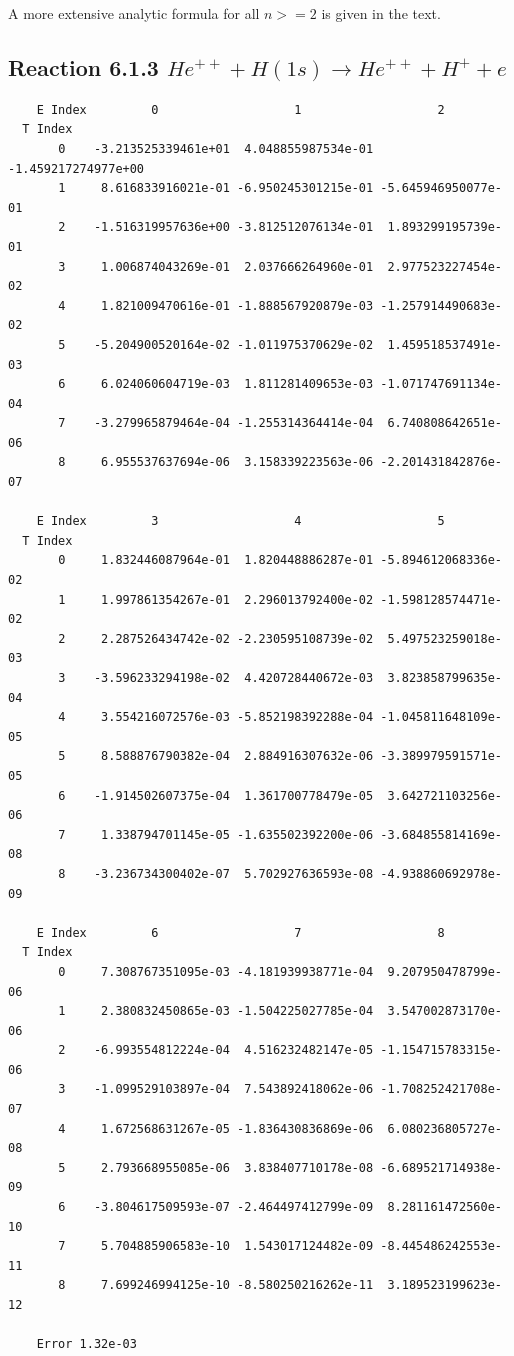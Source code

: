 \documentclass[12pt,dvipdfmx]{article}
\begin{document}
A more extensive analytic formula for all $n >= 2$ is given in the text.




\newpage
\subsection{
Reaction 6.1.3 $   He^{++} + H(1s) \rightarrow He^{++} + H^+ + e$}

\begin{small}\begin{verbatim}
    E Index         0                   1                   2
  T Index
       0    -3.213525339461e+01  4.048855987534e-01 -1.459217274977e+00
       1     8.616833916021e-01 -6.950245301215e-01 -5.645946950077e-01
       2    -1.516319957636e+00 -3.812512076134e-01  1.893299195739e-01
       3     1.006874043269e-01  2.037666264960e-01  2.977523227454e-02
       4     1.821009470616e-01 -1.888567920879e-03 -1.257914490683e-02
       5    -5.204900520164e-02 -1.011975370629e-02  1.459518537491e-03
       6     6.024060604719e-03  1.811281409653e-03 -1.071747691134e-04
       7    -3.279965879464e-04 -1.255314364414e-04  6.740808642651e-06
       8     6.955537637694e-06  3.158339223563e-06 -2.201431842876e-07

    E Index         3                   4                   5
  T Index
       0     1.832446087964e-01  1.820448886287e-01 -5.894612068336e-02
       1     1.997861354267e-01  2.296013792400e-02 -1.598128574471e-02
       2     2.287526434742e-02 -2.230595108739e-02  5.497523259018e-03
       3    -3.596233294198e-02  4.420728440672e-03  3.823858799635e-04
       4     3.554216072576e-03 -5.852198392288e-04 -1.045811648109e-05
       5     8.588876790382e-04  2.884916307632e-06 -3.389979591571e-05
       6    -1.914502607375e-04  1.361700778479e-05  3.642721103256e-06
       7     1.338794701145e-05 -1.635502392200e-06 -3.684855814169e-08
       8    -3.236734300402e-07  5.702927636593e-08 -4.938860692978e-09

    E Index         6                   7                   8
  T Index
       0     7.308767351095e-03 -4.181939938771e-04  9.207950478799e-06
       1     2.380832450865e-03 -1.504225027785e-04  3.547002873170e-06
       2    -6.993554812224e-04  4.516232482147e-05 -1.154715783315e-06
       3    -1.099529103897e-04  7.543892418062e-06 -1.708252421708e-07
       4     1.672568631267e-05 -1.836430836869e-06  6.080236805727e-08
       5     2.793668955085e-06  3.838407710178e-08 -6.689521714938e-09
       6    -3.804617509593e-07 -2.464497412799e-09  8.281161472560e-10
       7     5.704885906583e-10  1.543017124482e-09 -8.445486242553e-11
       8     7.699246994125e-10 -8.580250216262e-11  3.189523199623e-12

    Error 1.32e-03
\end{verbatim}\end{small}
\end{document}
